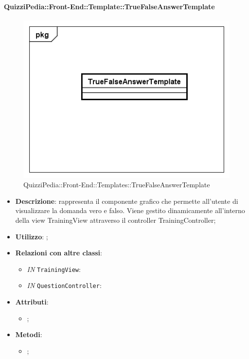 		\paragraph{QuizziPedia::Front-End::Template::TrueFalseAnswerTemplate}
		
		\label{QuizziPedia::Front-End::Templates::TrueFalseAnswerTemplate}
		
		\begin{figure}[h]
			\centering
			\includegraphics[scale=0.5,keepaspectratio]{UML/Classi/Front-End/QuizziPedia_Front-end_Templates_TrueFalseAnswerTemplate.png}
			\caption{QuizziPedia::Front-End::Templates::TrueFalseAnswerTemplate}
		\end{figure}
		
		\begin{itemize}
			\item \textbf{Descrizione}: rappresenta il componente grafico che permette all'utente di visualizzare la domanda vero e falso. Viene gestito dinamicamente all'interno della view TrainingView attraverso il controller TrainingController;
			\item \textbf{Utilizzo}: ;
			\item \textbf{Relazioni con altre classi}: 
			\begin{itemize}
				\item \textit{IN} \texttt{TrainingView}: 
				\item \textit{IN} \texttt{QuestionController}:
			\end{itemize}
			\item \textbf{Attributi}: 
			\begin{itemize}
				\item ;
			\end{itemize}
			\item \textbf{Metodi}: 
			\begin{itemize}
				\item ;
			\end{itemize}
		\end{itemize}																	